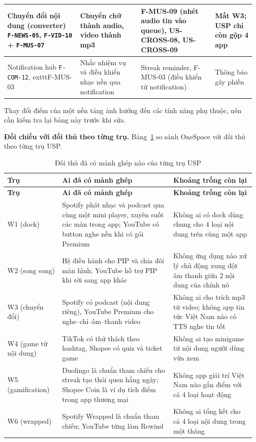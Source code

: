 \begin{longtable}{>{\raggedright\arraybackslash}p{2.9cm} >{\raggedright\arraybackslash}p{4.6cm} >{\raggedright\arraybackslash}p{3.6cm} >{\raggedright\arraybackslash}p{3.5cm}}
\midrule
Chuyển đổi nội dung (converter) \newline \texttt{F-NEWS-05}, \texttt{F-VID-10} + \texttt{F-MUS-07} & Chuyển chữ thành audio, video thành mp3 & F-MUS-09 (nhét audio tin vào queue), US-CROSS-08, US-CROSS-09 & Mất W3; USP chỉ còn gộp 4 app \\
\midrule
Notification hub \newline \texttt{F-COM-12}, 	exttt{F-MUS-03} & Nhắc nhiệm vụ và điều khiển nhạc nền qua notification & Streak reminder, F-MUS-03 (điều khiển từ notification) & Thông báo gây phiền \\
\end{longtable}

Thay đổi điểm của một nền tảng ảnh hưởng đến các tính năng phụ thuộc, nên cần kiểm tra lại bảng này trước khi sửa.

\textbf{Đối chiếu với đối thủ theo từng trụ.} Bảng~\ref{tab:competitor-pillars} so sánh OneSpace với đối thủ theo từng trụ USP.

\begin{longtable}{>{\raggedright\arraybackslash}p{2.8cm} >{\raggedright\arraybackslash}p{6.4cm} >{\raggedright\arraybackslash}p{5.4cm}}
\caption{Đối thủ đã có mảnh ghép nào của từng trụ USP}
\label{tab:competitor-pillars}\\
\toprule
\textbf{Trụ} & \textbf{Ai đã có mảnh ghép} & \textbf{Khoảng trống còn lại} \\
\midrule
\endfirsthead
\toprule
\textbf{Trụ} & \textbf{Ai đã có mảnh ghép} & \textbf{Khoảng trống còn lại} \\
\midrule
\endhead
\bottomrule
\endfoot
W1 (dock) & Spotify phát nhạc và podcast qua cùng một mini player, xuyên suốt các màn trong app; YouTube có button nghe nền khi có gói Premium & Không ai có dock dùng chung cho 4 loại nội dung trên cùng một app \\
W2 (song song) & Hệ điều hành cho PIP và chia đôi màn hình; YouTube hỗ trợ PIP khi rời sang app khác & Không ứng dụng nào xử lý chủ động xung đột âm thanh giữa 2 nội dung của chính nó \\
W3 (chuyển đổi) & Spotify có podcast (nội dung riêng), YouTube Premium cho nghe--chỉ--âm--thanh video & Không ai cho trích mp3 từ video; không app tin tức Việt Nam nào có TTS nghe tin tốt \\
W4 (game từ nội dung) & TikTok có thử thách theo hashtag, Shopee có quiz và ticket game & Không ai tạo minigame từ nội dung người dùng vừa xem \\
W5 (gamification) & Duolingo là chuẩn tham chiếu cho streak tạo thói quen hằng ngày; Shopee Coin là ví dụ tích điểm trong app thương mại & Không app giải trí Việt Nam nào gắn điểm với cả 4 loại hoạt động \\
W6 (wrapped) & Spotify Wrapped là chuẩn tham chiếu; YouTube từng làm Rewind & Không ai tổng kết cho cả 4 loại nội dung trong một tháng \\
\end{longtable}